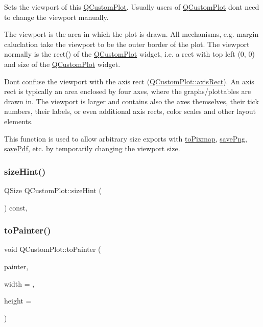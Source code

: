 Sets the viewport of this \mbox{\hyperlink{class_q_custom_plot}{Q\+Custom\+Plot}}. Usually users of \mbox{\hyperlink{class_q_custom_plot}{Q\+Custom\+Plot}} don\textquotesingle{}t need to change the viewport manually.

The viewport is the area in which the plot is drawn. All mechanisms, e.\+g. margin caluclation take the viewport to be the outer border of the plot. The viewport normally is the rect() of the \mbox{\hyperlink{class_q_custom_plot}{Q\+Custom\+Plot}} widget, i.\+e. a rect with top left (0, 0) and size of the \mbox{\hyperlink{class_q_custom_plot}{Q\+Custom\+Plot}} widget.

Don\textquotesingle{}t confuse the viewport with the axis rect (\mbox{\hyperlink{class_q_custom_plot_ae5eefcb5f6ca26689b1fd4f6e25b42f9}{Q\+Custom\+Plot\+::axis\+Rect}}). An axis rect is typically an area enclosed by four axes, where the graphs/plottables are drawn in. The viewport is larger and contains also the axes themselves, their tick numbers, their labels, or even additional axis rects, color scales and other layout elements.

This function is used to allow arbitrary size exports with \mbox{\hyperlink{class_q_custom_plot_aabb974d71ce96c137dc04eb6eab844fe}{to\+Pixmap}}, \mbox{\hyperlink{class_q_custom_plot_ac92cc9256d12f354b40a4be4600b5fb9}{save\+Png}}, \mbox{\hyperlink{class_q_custom_plot_ad5acd34f6b39c3516887d7e54fec2412}{save\+Pdf}}, etc. by temporarily changing the viewport size. \mbox{\label{class_q_custom_plot_ac9d6fe101e082daf756903b11f6e6213}} 
\subsubsection{\texorpdfstring{sizeHint()}{sizeHint()}}
{\footnotesize\ttfamily Q\+Size Q\+Custom\+Plot\+::size\+Hint (\begin{DoxyParamCaption}{ }\end{DoxyParamCaption}) const\hspace{0.3cm}{\ttfamily [protected]}, {\ttfamily [virtual]}}

\mbox{\label{class_q_custom_plot_a1be68d5c0f1e086d6374d1340a193fb9}} 
\subsubsection{\texorpdfstring{toPainter()}{toPainter()}}
{\footnotesize\ttfamily void Q\+Custom\+Plot\+::to\+Painter (\begin{DoxyParamCaption}\item[{\mbox{\hyperlink{class_q_c_p_painter}{Q\+C\+P\+Painter}} $\ast$}]{painter,  }\item[{int}]{width = {},  }\item[{int}]{height = {} }\end{DoxyParamCaption})}

